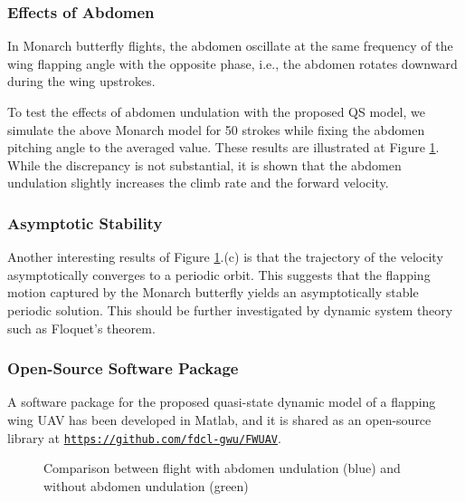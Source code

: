 \documentclass[10pt]{article}
\begin{document}
\subsubsection{Effects of Abdomen}

In Monarch butterfly flights, the abdomen oscillate at the same frequency of the wing flapping angle with the opposite phase,
i.e., the abdomen rotates downward during the wing upstrokes. 


To test the effects of abdomen undulation with the proposed QS model, we simulate the above Monarch model for 50 strokes while fixing the abdomen pitching angle to the averaged value. 
These results are illustrated at Figure \ref{fig:comp_ab}.
While the discrepancy is not substantial, it is shown that the abdomen undulation slightly increases the climb rate and the forward velocity.  

\subsubsection{Asymptotic Stability}

Another interesting results of Figure \ref{fig:comp_ab}.(c) is that the trajectory of the velocity asymptotically converges to a periodic orbit.  
This suggests that the flapping motion captured by the Monarch butterfly yields an asymptotically stable periodic solution. 
This should be further investigated by dynamic system theory such as Floquet's theorem. 

\subsubsection{Open-Source Software Package}

A software package for the proposed quasi-state dynamic model of a flapping wing UAV has been developed in Matlab, and it is shared as an open-source library at \href{https://github.com/fdcl-gwu/FWUAV}{\texttt{https://github.com/fdcl-gwu/FWUAV}}.

\begin{figure}[p]
    \centerline{
        \hfill
    }
    \centerline{
        \hfill
    }
    \caption{Comparison between flight with abdomen undulation (blue) and without abdomen undulation (green)}\label{fig:comp_ab}
\end{figure}
\end{document}
